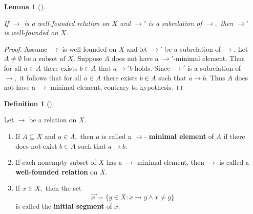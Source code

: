 \documentclass[
  letterpaper,
  10pt,
  reqno,
  twopage,
  openany]{book}
\providecommand{\tightlist}{%
  \setlength{\itemsep}{0pt}\setlength{\parskip}{0pt}}\usepackage{longtable,booktabs,array}
\theoremstyle{plain}
\newtheorem{lemma}{Lemma}[chapter]
\theoremstyle{definition}
\theoremstyle{definition}
\newtheorem{definition}{Definition}[chapter]
\theoremstyle{definition}
\theoremstyle{plain}
\theoremstyle{plain}
\theoremstyle{remark}
\begin{document}
\leavevmode{}%
\begin{lemma}[]\label{lem-well-founded-subrelation}

If \(\longrightarrow\) is a well-founded relation on \(X\) and
\(\longrightarrow'\) is a subrelation of \(\longrightarrow,\) then
\(\longrightarrow'\) is well-founded on \(X.\)

\end{lemma}

\begin{proof}

Assume \(\longrightarrow\) is well-founded on \(X\) and let
\(\longrightarrow'\) be a subrelation of \(\longrightarrow.\) Let
\(A\neq\emptyset\) be a subset of \(X.\) Suppose \(A\) does not have a
\(\longrightarrow'\)-minimal element. Thus for all \(a\in A\) there
exists \(b\in A\) that \(a\longrightarrow' b\) holds. Since
\(\longrightarrow'\) is a subrelation of \(\longrightarrow,\) it follows
that for all \(a\in A\) there exists \(b\in A\) such that
\(a\longrightarrow b.\) Thus \(A\) does not have a
\(\longrightarrow\)-minimal element, contrary to hypothesis.

\end{proof}

\leavevmode{}%
\begin{definition}[]\label{def-well-founded-relation}

Let \(\longrightarrow\) be a relation on \(X.\)

\begin{enumerate}
\def\labelenumi{\arabic{enumi}.}
\tightlist
\item
  If \(A\subseteq X\) and \(a\in A,\) then \(a\) is called a
  \(\longrightarrow\)- \textbf{minimal element}
  of \(A\) if there does not exist \(b\in A\) such that
  \(a\longrightarrow b.\)
\item
  If each nonempty subset of \(X\) has a \(\longrightarrow\)-minimal
  element, then \(\longrightarrow\) is called a
   \textbf{well-founded relation} on \(X.\)
\item
  If \(x\in X,\) then the set
  \[\overrightarrow{x\,}=\{y\in X : x\longrightarrow y \land x\neq y\}\]
  is called the  \textbf{initial segment} of
  \(x.\)
\end{enumerate}

\end{definition}
\end{document}
